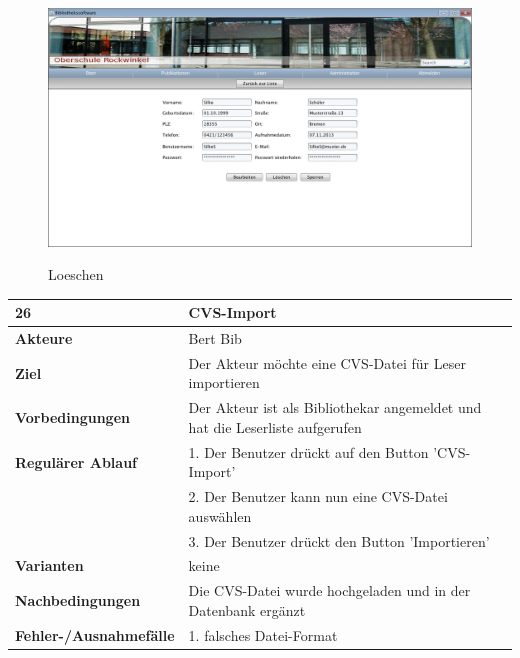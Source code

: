 \documentclass[fontsize=12pt,paper=a4,twoside]{scrartcl}
\begin{document}
\begin{figure}[htbp]
\caption{Loeschen}
\includegraphics[width=1\textwidth]{ScreensWebsite/DetailansichtLeser.png}
  \label{Leser loeschen}
\end{figure}


\begin{table}[htbp]
\label{26}
\begin{tabular}{|l|p{10cm}|}
\hline 
\textbf{26} & \textbf{CVS-Import} \\ \hline
\textbf{Akteure} & Bert Bib\\ \hline
\textbf{Ziel} & Der Akteur möchte eine CVS-Datei für Leser importieren \\ \hline
\textbf{Vorbedingungen} & Der Akteur ist als Bibliothekar angemeldet und hat die Leserliste aufgerufen\\
\hline
\textbf{Regulärer Ablauf} & 
1. Der Benutzer drückt auf den Button 'CVS-Import' \\
&2. Der Benutzer kann nun eine CVS-Datei auswählen\\
&3. Der Benutzer drückt den Button 'Importieren'\\
\hline
\textbf{Varianten} & 
keine \\ \hline
\textbf{Nachbedingungen} & Die CVS-Datei wurde hochgeladen und in der Datenbank ergänzt\\ \hline
\textbf{Fehler-/Ausnahmefälle} & 1. falsches Datei-Format\\
\hline
\end{tabular}
\end{table}
\end{document}
